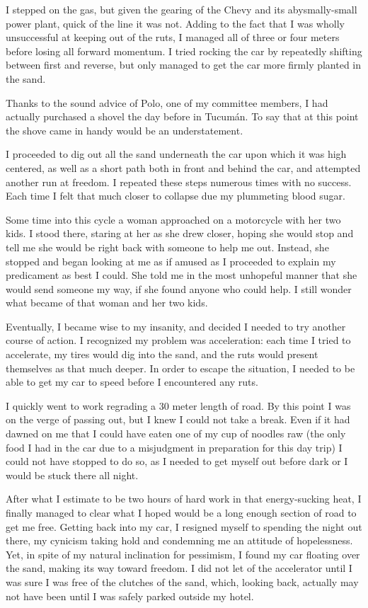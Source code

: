 I stepped on the gas, but given the gearing of the Chevy and its abysmally-small power plant, quick of the line it was not. Adding to the fact that I was wholly unsuccessful at keeping out of the ruts, I managed all of three or four meters before losing all forward momentum. I tried rocking the car by repeatedly shifting between first and reverse, but only managed to get the car more firmly planted in the sand.

Thanks to the sound advice of Polo, one of my committee members, I had actually purchased a shovel the day before in Tucumán. To say that at this point the shove came in handy would be an understatement.

I proceeded to dig out all the sand underneath the car upon which it was high centered, as well as a short path both in front and behind the car, and attempted another run at freedom. I repeated these steps numerous times with no success. Each time I felt that much closer to collapse due my plummeting blood sugar.

Some time into this cycle a woman approached on a motorcycle with her two kids. I stood there, staring at her as she drew closer, hoping she would stop and tell me she would be right back with someone to help me out. Instead, she stopped and began looking at me as if amused as I proceeded to explain my predicament as best I could. She told me in the most unhopeful manner that she would send someone my way, if she found anyone who could help. I still wonder what became of that woman and her two kids.

Eventually, I became wise to my insanity, and decided I needed to try another course of action. I recognized my problem was acceleration: each time I tried to accelerate, my tires would dig into the sand, and the ruts would present themselves as that much deeper. In order to escape the situation, I needed to be able to get my car to speed before I encountered any ruts.

I quickly went to work regrading a 30 meter length of road. By this point I was on the verge of passing out, but I knew I could not take a break. Even if it had dawned on me that I could have eaten one of my cup of noodles raw (the only food I had in the car due to a misjudgment in preparation for this day trip) I could not have stopped to do so, as I needed to get myself out before dark or I would be stuck there all night.

After what I estimate to be two hours of hard work in that energy-sucking heat, I finally managed to clear what I hoped would be a long enough section of road to get me free. Getting back into my car, I resigned myself to spending the night out there, my cynicism taking hold and condemning me an attitude of hopelessness. Yet, in spite of my natural inclination for pessimism, I found my car floating over the sand, making its way toward freedom. I did not let of the accelerator until I was sure I was free of the clutches of the sand, which, looking back, actually may not have been until I was safely parked outside my hotel.


